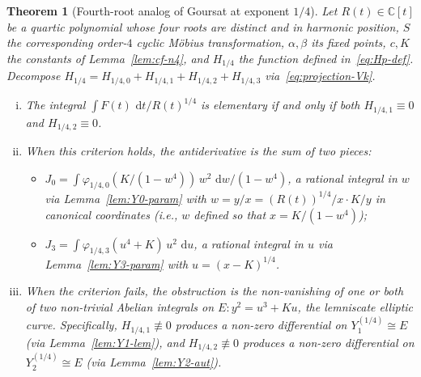 \documentclass[11pt,a4paper]{article}
\theoremstyle{plain}
\newtheorem{theorem}{Theorem}[section]
\theoremstyle{definition}
\theoremstyle{remark}
\newcommand{\C}{\mathbb{C}}
\renewcommand{\d}{\,\mathrm{d}}
\begin{document}
\begin{theorem}[Fourth-root analog of Goursat at exponent $1/4$]\label{thm:main-14}
Let $R(t) \in \C[t]$ be a quartic polynomial whose four roots are distinct and in harmonic position, $S$ the corresponding order-$4$ cyclic Möbius transformation, $\alpha, \beta$ its fixed points, $c, K$ the constants of Lemma~\ref{lem:cf-n4}, and $H_{1/4}$ the function defined in~\eqref{eq:Hp-def}. Decompose $H_{1/4} = H_{1/4,0} + H_{1/4,1} + H_{1/4,2} + H_{1/4,3}$ via~\eqref{eq:projection-Vk}.
\begin{enumerate}[(i)]
  \item The integral $\int F(t)\,\d t / R(t)^{1/4}$ is elementary if and only if both $H_{1/4,1} \equiv 0$ and $H_{1/4,2} \equiv 0$.
  \item When this criterion holds, the antiderivative is the sum of two pieces:
  \begin{itemize}
    \item $J_0 = \int \varphi_{1/4,0}(K/(1-w^4))\,w^2\,\d w/(1-w^4)$, a rational integral in $w$ via Lemma~\ref{lem:Y0-param} with $w = y/x = (R(t))^{1/4}/x \cdot K/y$ in canonical coordinates (i.e., $w$ defined so that $x = K/(1-w^4)$);
    \item $J_3 = \int \varphi_{1/4,3}(u^4 + K)\,u^2\,\d u$, a rational integral in $u$ via Lemma~\ref{lem:Y3-param} with $u = (x-K)^{1/4}$.
  \end{itemize}
  \item When the criterion fails, the obstruction is the non-vanishing of one or both of two non-trivial Abelian integrals on $E\colon y^2 = u^3 + K u$, the lemniscate elliptic curve. Specifically, $H_{1/4,1} \not\equiv 0$ produces a non-zero differential on $Y_1^{(1/4)} \cong E$ (via Lemma~\ref{lem:Y1-lem}), and $H_{1/4,2} \not\equiv 0$ produces a non-zero differential on $Y_2^{(1/4)} \cong E$ (via Lemma~\ref{lem:Y2-aut}).
\end{enumerate}
\end{theorem}
\end{document}
